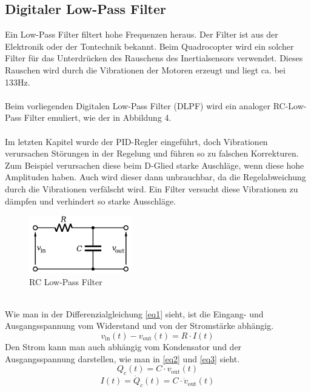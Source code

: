 \documentclass[12pt,a4paper, ngerman]{article}
\begin{document}
\subsection{Digitaler Low-Pass Filter}
Ein Low-Pass Filter filtert hohe Frequenzen heraus. Der Filter ist aus der Elektronik oder der Tontechnik bekannt. Beim Quadrocopter wird ein solcher Filter für das Unterdrücken des Rauschens des Inertialsensors verwendet. Dieses Rauschen wird durch die Vibrationen der Motoren erzeugt und liegt ca. bei 133Hz.\\ \\
Beim vorliegenden Digitalen Low-Pass Filter (DLPF) wird ein analoger RC-Low-Pass Filter emuliert, wie der in Abbildung 4.\cite{website:Wikipedia_LPF}\\ \\
Im letzten Kapitel wurde der PID-Regler eingeführt, doch Vibrationen verursachen Störungen in der Regelung und führen so zu falschen Korrekturen. Zum Beispiel verursachen diese beim D-Glied starke Auschläge, wenn diese hohe Amplituden haben. Auch wird dieser dann unbrauchbar, da die Regelabweichung durch die Vibrationen verfälscht wird. Ein Filter versucht diese Vibrationen zu dämpfen und verhindert so starke Ausschläge.
\begin{figure}[h]
\centering
\includegraphics[width=0.4\textwidth]{DLPF1.png}
\caption[\url{https://upload.wikimedia.org/wikipedia/commons/e/e0/1st_Order_Lowpass_Filter_RC.svg}]{RC Low-Pass Filter}
\end{figure}\\
Wie man in der Differenzialgleichung \ref{eq1} sieht, ist die Eingang- und Ausgangsspannung vom Widerstand und von der Stromstärke abhängig.
\begin{equation} \label{eq1}
v_{\text{in}}(t)-v_{\text{out}}(t)=R\cdot I(t)
\end{equation}
Den Strom kann man auch abhängig vom Kondensator und der Ausgangsspannung darstellen, wie man in \ref{eq2} und \ref{eq3} sieht.
\begin{equation} \label{eq2}
Q_{c}(t)=C\cdot v_{\text{out}}(t)
\end{equation}
\begin{equation} \label{eq3}
I(t)=\dot{Q}_{c}(t)=C\cdot \dot{v}_{\text{out}}(t)
\end{equation}
\end{document}
